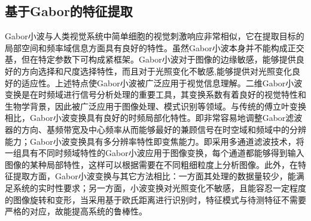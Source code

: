\subsection{基于Gabor的特征提取}


Gabor小波与人类视觉系统中简单细胞的视觉刺激响应非常相似，它在提取目标的局部空间和频率域信息方面具有良好的特性\citep{Daugman1988,Kyrki2004Simple}。虽然Gabor小波本身并不能构成正交基，但在特定参数下可构成紧框架。Gabor小波对于图像的边缘敏感，能够提供良好的方向选择和尺度选择特性，而且对于光照变化不敏感,能够提供对光照变化良好的适应性。上述特点使Gabor小波被广泛应用于视觉信息理解。二维Gabor小波变换是在时频域进行信号分析处理的重要工具，其变换系数有着良好的视觉特性和生物学背景，因此被广泛应用于图像处理、模式识别等领域。与传统的傅立叶变换相比，Gabor小波变换具有良好的时频局部化特性。即非常容易地调整Gabor滤波器的方向、基频带宽及中心频率从而能够最好的兼顾信号在时空域和频域中的分辨能力；Gabor小波变换具有多分辨率特性即变焦能力。即采用多通道滤波技术，将一组具有不同时频域特性的Gabor小波应用于图像变换，每个通道都能够得到输入图像的某种局部特性，这样可以根据需要在不同粗细粒度上分析图像。此外，在特征提取方面，Gabor小波变换与其它方法相比：一方面其处理的数据量较少，能满足系统的实时性要求；另一方面，小波变换对光照变化不敏感，且能容忍一定程度的图像旋转和变形，当采用基于欧氏距离进行识别时，特征模式与待测特征不需要严格的对应，故能提高系统的鲁棒性。

